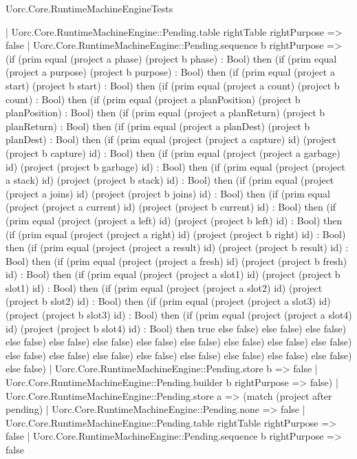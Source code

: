 \begin{lexlean}{Uorc.Core.RuntimeMachineEngineTests}
\begin{semanticmodule}
{      | Uorc.Core.RuntimeMachineEngine::Pending.table rightTable rightPurpose => false
      | Uorc.Core.RuntimeMachineEngine::Pending.sequence b rightPurpose => (if (prim equal (project a phase) (project b phase) : Bool) then (if (prim equal (project a purpose) (project b purpose) : Bool) then (if (prim equal (project a start) (project b start) : Bool) then (if (prim equal (project a count) (project b count) : Bool) then (if (prim equal (project a planPosition) (project b planPosition) : Bool) then (if (prim equal (project a planReturn) (project b planReturn) : Bool) then (if (prim equal (project a planDest) (project b planDest) : Bool) then (if (prim equal (project (project a capture) id) (project (project b capture) id) : Bool) then (if (prim equal (project (project a garbage) id) (project (project b garbage) id) : Bool) then (if (prim equal (project (project a stack) id) (project (project b stack) id) : Bool) then (if (prim equal (project (project a joins) id) (project (project b joins) id) : Bool) then (if (prim equal (project (project a current) id) (project (project b current) id) : Bool) then (if (prim equal (project (project a left) id) (project (project b left) id) : Bool) then (if (prim equal (project (project a right) id) (project (project b right) id) : Bool) then (if (prim equal (project (project a result) id) (project (project b result) id) : Bool) then (if (prim equal (project (project a fresh) id) (project (project b fresh) id) : Bool) then (if (prim equal (project (project a slot1) id) (project (project b slot1) id) : Bool) then (if (prim equal (project (project a slot2) id) (project (project b slot2) id) : Bool) then (if (prim equal (project (project a slot3) id) (project (project b slot3) id) : Bool) then (if (prim equal (project (project a slot4) id) (project (project b slot4) id) : Bool) then true else false) else false) else false) else false) else false) else false) else false) else false) else false) else false) else false) else false) else false) else false) else false) else false) else false) else false) else false) else false)
      | Uorc.Core.RuntimeMachineEngine::Pending.store b => false
      | Uorc.Core.RuntimeMachineEngine::Pending.builder b rightPurpose => false)
    | Uorc.Core.RuntimeMachineEngine::Pending.store a => (match (project after pending)
      | Uorc.Core.RuntimeMachineEngine::Pending.none => false
      | Uorc.Core.RuntimeMachineEngine::Pending.table rightTable rightPurpose => false
      | Uorc.Core.RuntimeMachineEngine::Pending.sequence b rightPurpose => false
}
\end{semanticmodule}
\end{lexlean}
